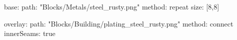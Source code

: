 base:
  path: "Blocks/Metals/steel_rusty.png"
  method: repeat
  size: [8,8]

overlay:
  path: "Blocks/Building/plating_steel_rusty.png"
  method: connect
  innerSeams: true